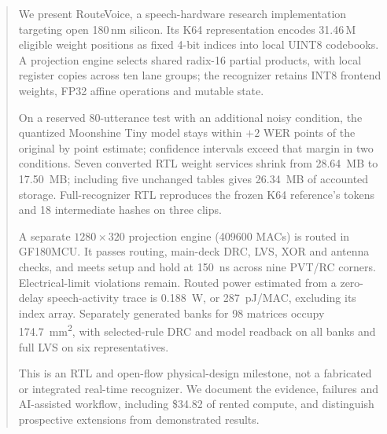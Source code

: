 \begin{abstract}
We present RouteVoice, a speech-hardware research implementation targeting open 180\,nm silicon. Its K64 representation encodes 31.46\,M eligible weight positions as fixed 4-bit indices into local UINT8 codebooks. A projection engine selects shared radix-16 partial products, with local register copies across ten lane groups; the recognizer retains INT8 frontend weights, FP32 affine operations and mutable state.

On a reserved 80-utterance test with an additional noisy condition, the quantized Moonshine Tiny model stays within $+2$ WER points of the original by point estimate; confidence intervals exceed that margin in two conditions. Seven converted RTL weight services shrink from \SI{28.64}{MB} to \SI{17.50}{MB}; including five unchanged tables gives \SI{26.34}{MB} of accounted storage. Full-recognizer RTL reproduces the frozen K64 reference's tokens and 18 intermediate hashes on three clips.

A separate $1280\times320$ projection engine (\num{409600} MACs) is routed in GF180MCU. It passes routing, main-deck DRC, LVS, XOR and antenna checks, and meets setup and hold at \SI{150}{ns} across nine PVT/RC corners. Electrical-limit violations remain. Routed power estimated from a zero-delay speech-activity trace is \SI{0.188}{W}, or \SI{287}{pJ}/MAC, excluding its index array. Separately generated banks for 98 matrices occupy \SI{174.7}{mm^2}, with selected-rule DRC and model readback on all banks and full LVS on six representatives.

This is an RTL and open-flow physical-design milestone, not a fabricated or integrated real-time recognizer. We document the evidence, failures and AI-assisted workflow, including \$34.82 of rented compute, and distinguish prospective extensions from demonstrated results.
\end{abstract}
